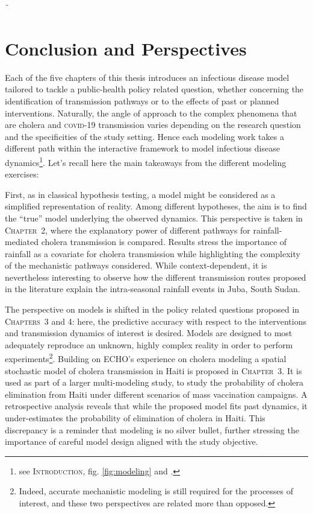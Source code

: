 ¨\chapter*{Conclusion and Perspectives}
Each of the five chapters of this thesis introduces an infectious disease model tailored to tackle a public-health policy related question, whether concerning the identification of transmission pathways or to the effects of past or planned interventions. Naturally, the angle of approach to the complex phenomena that are cholera and \textsc{covid}-19 transmission varies depending on the research question and the specificities of the study setting. Hence each modeling work takes a different path within the interactive framework to model infectious disease dynamics\footnote{see \textsc{Introduction}, fig. \ref{fig:modeling} and .}. Let's recall here the main takeaways from the different modeling exercises:


First, as in classical hypothesis testing, a model might be considered as a simplified representation of reality. Among different hypotheses, the aim is to find the ``true'' model underlying the observed dynamics. This perspective is taken in \textsc{Chapter~2}, where the explanatory power of different pathways for rainfall-mediated cholera transmission is compared\cite{Rinaldo:Reassessment20102011:2012, Eisenberg:ExaminingRainfallCholera:2013}. Results stress the importance of rainfall as a covariate for cholera transmission while highlighting the complexity of the mechanistic pathways considered. While context-dependent, it is nevertheless interesting to observe how the different transmission routes proposed in the literature explain the intra-seasonal rainfall events in Juba, South Sudan.

The perspective on models is shifted in the policy related questions proposed in \textsc{Chapters~3} and 4: here, the predictive accuracy with respect to the interventions and transmission dynamics of interest is desired. Models are designed to most adequately reproduce an unknown, highly complex reality in order to perform experiments\footnote{Indeed, accurate mechanistic modeling is still required for the processes of interest, and these two perspectives are related more than opposed.}. Building on ECHO's experience on cholera modeling\cite{Rinaldo:RiverNetworksEcological:2020a} a spatial stochastic model of cholera transmission in Haiti is proposed in \textsc{Chapter~3}. It is used as part of a larger multi-modeling study\cite{Lee:AchievingCoordinatedNational:2020}, to study the probability of cholera elimination from Haiti under different scenarios of mass vaccination campaigns. A retrospective analysis reveals that while the proposed model fits past dynamics, it under-estimates the probability of elimination of cholera in Haiti. This discrepancy is a reminder that modeling is no silver bullet, further stressing the importance of careful model design aligned with the study objective. 

